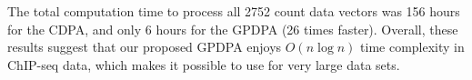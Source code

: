 \documentclass{article}
\begin{document}
The total computation time to process all 2752 count data vectors was
156 hours for the CDPA, and only 6 hours for the GPDPA (26 times
faster). Overall, these results suggest that our proposed GPDPA enjoys
$O(n\log n)$ time complexity in ChIP-seq data, which makes it possible
to use for very large data sets.






\end{document}
